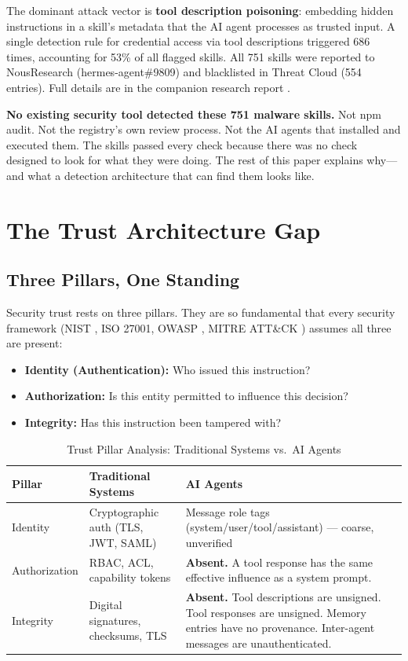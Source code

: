\documentclass[11pt,letterpaper]{article}
\begin{document}
The dominant attack vector is \textbf{tool description poisoning}: embedding hidden instructions in a skill's metadata that the AI agent processes as trusted input. A single detection rule for credential access via tool descriptions triggered 686 times, accounting for 53\% of all flagged skills. All 751 skills were reported to NousResearch (hermes-agent\#9809) and blacklisted in Threat Cloud (554 entries). Full details are in the companion research report \cite{atrscanmega}.

\textbf{No existing security tool detected these 751 malware skills.} Not npm audit. Not the registry's own review process. Not the AI agents that installed and executed them. The skills passed every check because there was no check designed to look for what they were doing. The rest of this paper explains why---and what a detection architecture that can find them looks like.


\section{The Trust Architecture Gap}
\label{sec:trustgap}

\subsection{Three Pillars, One Standing}

Security trust rests on three pillars. They are so fundamental that every security framework (NIST \cite{nist}, ISO 27001, OWASP \cite{owaspllm,owaspagentic}, MITRE ATT\&CK \cite{mitreatlas}) assumes all three are present:

\begin{itemize}
\item \textbf{Identity (Authentication):} Who issued this instruction?
\item \textbf{Authorization:} Is this entity permitted to influence this decision?
\item \textbf{Integrity:} Has this instruction been tampered with?
\end{itemize}

\begin{table}[htbp]
\centering
\caption{Trust Pillar Analysis: Traditional Systems vs.\ AI Agents}
\label{tab:pillars}
\begin{tabularx}{\textwidth}{lXX}
\toprule
\textbf{Pillar} & \textbf{Traditional Systems} & \textbf{AI Agents} \\
\midrule
Identity & Cryptographic auth (TLS, JWT, SAML) & Message role tags (system/user/tool/assistant) --- coarse, unverified \\
Authorization & RBAC, ACL, capability tokens & \textbf{Absent.} A tool response has the same effective influence as a system prompt. \\
Integrity & Digital signatures, checksums, TLS & \textbf{Absent.} Tool descriptions are unsigned. Tool responses are unsigned. Memory entries have no provenance. Inter-agent messages are unauthenticated. \\
\bottomrule
\end{tabularx}
\end{table}
\end{document}
